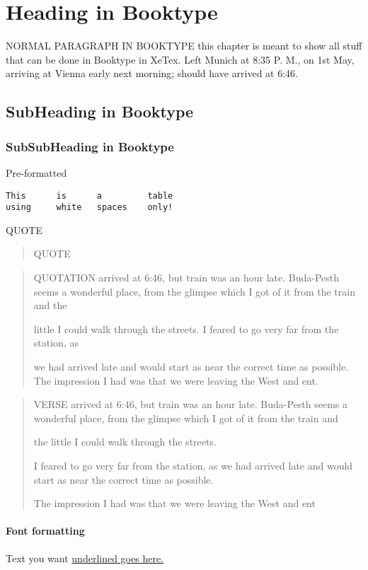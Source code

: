\chapter{Heading in Booktype}

NORMAL PARAGRAPH IN BOOKTYPE this chapter is meant to show all stuff that can be done in Booktype in XeTex. Left Munich at 8:35 P. M., on 1st May, arriving at Vienna early next morning; should have arrived at 6:46.

\section{SubHeading in Booktype}

\subsection{SubSubHeading in Booktype}

Pre-formatted
\begin{verbatim}
This      is      a         table
using     white   spaces    only!
\end{verbatim}

QUOTE
\begin{quote}
QUOTE \lipsum[1]
\end{quote}
\begin{quotation}
QUOTATION arrived at 6:46, but train was an hour late. Buda-Pesth seems a wonderful place, from the glimpse which I got of it from the train and the 

little I could walk through the streets. I feared to go very far from the station, as 

we had arrived late and would start as near the correct time as possible. The impression I had was that we were leaving the West and ent.
\end{quotation}
\begin{verse}
VERSE arrived at 6:46, but train was an hour late. Buda-Pesth seems a wonderful place, from the glimpse which I got of it from the train and 

the little I could walk through the streets. 

I feared to go very far from the station, as we had arrived late and would start as near the correct time as possible. 

The impression I had was that we were leaving the West and ent
\end{verse}

\subsubsection{Font formatting}
Text you want \underline{underlined goes here.} \blindtext


